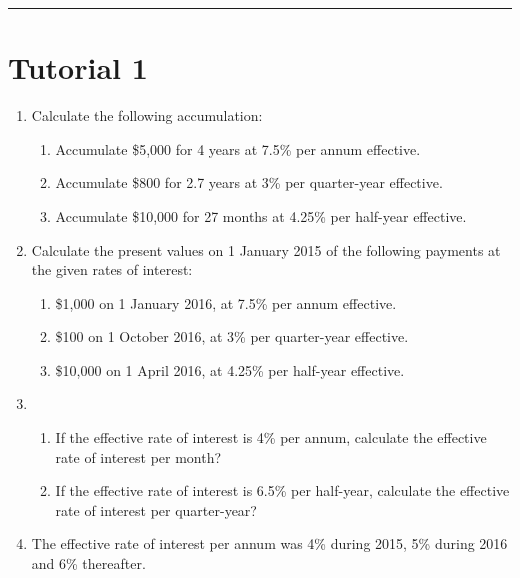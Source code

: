 \documentclass[
]{article}
\theoremstyle{definition}
\theoremstyle{definition}
\theoremstyle{definition}
\theoremstyle{definition}
\theoremstyle{remark}
\begin{document}
\begin{center}\rule{0.5\linewidth}{0.5pt}\end{center}

\hypertarget{tutorial-1}{%
\section{Tutorial 1}\label{tutorial-1}}

\begin{enumerate}
\def\labelenumi{\arabic{enumi}.}
\item
  Calculate the following accumulation:

  \begin{enumerate}
  \def\labelenumii{\arabic{enumii}.}
  \item
    Accumulate \$5,000 for 4 years at 7.5\% per annum effective.
  \item
    Accumulate \$800 for 2.7 years at 3\% per quarter-year effective.
  \item
    Accumulate \$10,000 for 27 months at 4.25\% per half-year
    effective.
  \end{enumerate}
\item
  Calculate the present values on 1 January 2015 of the following
  payments at the given rates of interest:

  \begin{enumerate}
  \def\labelenumii{\arabic{enumii}.}
  \item
    \$1,000 on 1 January 2016, at 7.5\% per annum effective.
  \item
    \$100 on 1 October 2016, at 3\% per quarter-year effective.
  \item
    \$10,000 on 1 April 2016, at 4.25\% per half-year effective.
  \end{enumerate}
\item
  \begin{enumerate}
  \def\labelenumii{\arabic{enumii}.}
  \item
    If the effective rate of interest is 4\% per annum, calculate the
    effective rate of interest per month?
  \item
    If the effective rate of interest is 6.5\% per half-year,
    calculate the effective rate of interest per quarter-year?
  \end{enumerate}
\item
  The effective rate of interest per annum was 4\% during 2015, 5\%
  during 2016 and 6\% thereafter.


\end{enumerate}
\end{document}
